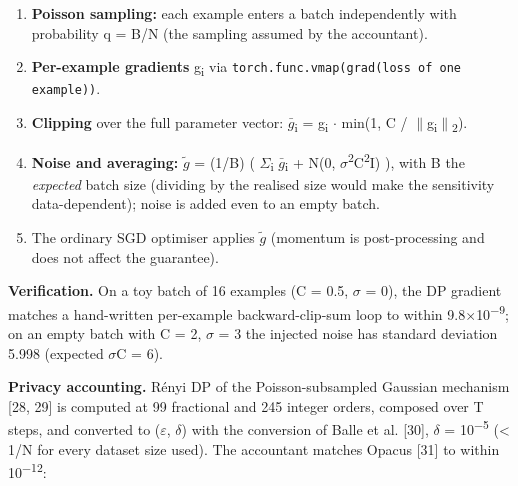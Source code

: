 \documentclass[10pt,a4paper]{article}
\begin{document}
\begin{enumerate}
\item \textbf{Poisson sampling:} each example enters a batch independently with probability q = B/\allowbreak{}N (the sampling assumed by the accountant).
\item \textbf{Per-example gradients} g\textsubscript{i} via \texttt{torch.func.vmap(grad(loss of one example))}.
\item \textbf{Clipping} over the full parameter vector: $\bar{g}$\textsubscript{i} = g\textsubscript{i} $\cdot$ min(1, C /\allowbreak{} $\|$g\textsubscript{i}$\|$\textsubscript{2}).
\item \textbf{Noise and averaging:} $\tilde{g}$ = (1/\allowbreak{}B) ( $\Sigma$\textsubscript{i} $\bar{g}$\textsubscript{i} + N(0, $\sigma$\textsuperscript{2}C\textsuperscript{2}I) ), with B the \textit{expected} batch size (dividing by the realised size would make the sensitivity data-dependent); noise is added even to an empty batch.
\item The ordinary SGD optimiser applies $\tilde{g}$ (momentum is post-processing and does not affect the guarantee).
\end{enumerate}
\textbf{Verification.} On a toy batch of 16 examples (C = 0.5, $\sigma$ = 0), the DP gradient matches a hand-written per-example backward-clip-sum loop to within 9.8$\times$10\textsuperscript{$-$9}; on an empty batch with C = 2, $\sigma$ = 3 the injected noise has standard deviation 5.998 (expected $\sigma$C = 6).

\textbf{Privacy accounting.} R\'enyi DP of the Poisson-subsampled Gaussian mechanism [28, 29] is computed at 99 fractional and 245 integer orders, composed over T steps, and converted to ($\varepsilon$, $\delta$) with the conversion of Balle et al. [30], $\delta$ = 10\textsuperscript{$-$5} (\textless{} 1/\allowbreak{}N for every dataset size used). The accountant matches Opacus [31] to within 10\textsuperscript{$-$12}:
\end{document}
